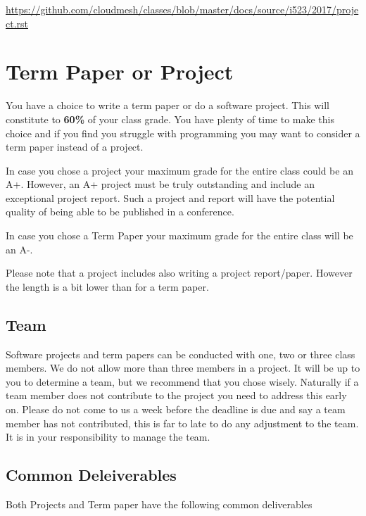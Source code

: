 \begin{fileremark}\url{https://github.com/cloudmesh/classes/blob/master/docs/source/i523/2017/project.rst}\end{fileremark}
\section{Term Paper or Project}\label{term-paper-or-project}

You have a choice to write a term paper or do a software project. This
will constitute to \textbf{60\%} of your class grade. You have plenty of
time to make this choice and if you find you struggle with programming
you may want to consider a term paper instead of a project.

In case you chose a project your maximum grade for the entire class
could be an A+. However, an A+ project must be truly outstanding and
include an exceptional project report. Such a project and report will
have the potential quality of being able to be published in a
conference.

In case you chose a Term Paper your maximum grade for the entire class
will be an A-.

Please note that a project includes also writing a project report/paper.
However the length is a bit lower than for a term paper.

\subsection{Team}\label{team}

Software projects and term papers can be conducted with one, two or
three class members. We do not allow more than three members in a
project. It will be up to you to determine a team, but we recommend that
you chose wisely. Naturally if a team member does not contribute to the
project you need to address this early on. Please do not come to us a
week before the deadline is due and say a team member has not
contributed, this is far to late to do any adjustment to the team. It is
in your responsibility to manage the team.

\subsection{Common Deleiverables}\label{common-deleiverables}

Both Projects and Term paper have the following common deliverables

